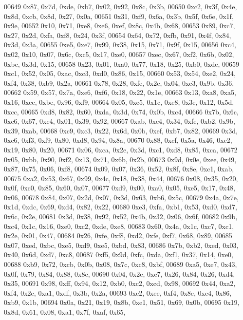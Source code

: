 \begin{DoxyCode}
00649   0x87, 0x7d, 0xde, 0xb7, 0x02, 0x92, 0x8c, 0x3b,
00650   0xc2, 0x3f, 0x4e, 0x8d, 0xcb, 0x8d, 0x27, 0x0a,
00651   0x31, 0xf9, 0x6a, 0x3b, 0x5f, 0x6e, 0x1f, 0x9e,
00652   0x10, 0x71, 0xe8, 0xe6, 0xef, 0x8c, 0x4b, 0x68,
00653   0x89, 0xc7, 0x27, 0x2d, 0xfa, 0xf8, 0x24, 0x3f,
00654   0x64, 0x72, 0xfb, 0x91, 0x4f, 0x84, 0x3d, 0x3a,
00655   0xe5, 0xe7, 0x99, 0x38, 0x15, 0x71, 0x9f, 0x15,
00656   0xc4, 0x02, 0x10, 0x07, 0x6c, 0xc5, 0x17, 0xe0,
00657   0xec, 0x67, 0xf2, 0x6b, 0x02, 0xbc, 0x3d, 0x15,
00658   0x23, 0x01, 0xa0, 0x77, 0x18, 0x25, 0xb0, 0xde,
00659   0xc1, 0x52, 0x05, 0xac, 0xc3, 0xd0, 0x86, 0x15,
00660   0x53, 0x54, 0xe2, 0x24, 0xf4, 0x38, 0xb9, 0x2a,
00661   0x78, 0x28, 0xfe, 0x2c, 0x04, 0xc3, 0x9b, 0x36,
00662   0x59, 0x57, 0x7a, 0xe6, 0xf6, 0x18, 0x22, 0x1e,
00663   0x13, 0xa8, 0xa5, 0x16, 0xee, 0xbe, 0x96, 0xf9,
00664   0x05, 0xe5, 0x1c, 0xe8, 0x3e, 0x12, 0x5d, 0xcc,
00665   0xd8, 0x82, 0x60, 0xda, 0x3d, 0x74, 0x0b, 0xc4,
00666   0x7b, 0x6c, 0xc6, 0x67, 0xe4, 0x01, 0x39, 0x92,
00667   0xab, 0xe4, 0x34, 0xfe, 0xb2, 0x9b, 0x39, 0xab,
00668   0xc9, 0xc3, 0x22, 0x6d, 0x0b, 0xef, 0xb7, 0x82,
00669   0x3d, 0xc6, 0xf3, 0xf9, 0x80, 0xd8, 0x94, 0x8a,
00670   0x88, 0xcf, 0x5a, 0x46, 0xc2, 0x19, 0x80, 0x20,
00671   0x06, 0xca, 0x2e, 0x3d, 0xc1, 0xd8, 0x85, 0xca,
00672   0x05, 0xbb, 0x90, 0xf2, 0x13, 0x71, 0x6b, 0x2b,
00673   0x9d, 0x0e, 0xee, 0x49, 0x87, 0x75, 0x06, 0xf8,
00674   0x09, 0x07, 0x36, 0x52, 0x8f, 0x8e, 0xc1, 0xab,
00675   0xa2, 0x53, 0x67, 0x99, 0x4c, 0x18, 0x38, 0x44,
00676   0x08, 0x35, 0x20, 0x0f, 0xc0, 0x85, 0x60, 0x07,
00677   0xd9, 0x00, 0xa0, 0x05, 0xe5, 0x17, 0x48, 0x06,
00678   0x84, 0x07, 0x2d, 0x07, 0x3d, 0x63, 0xb6, 0x5c,
00679   0x4a, 0x7e, 0x1d, 0xdc, 0x69, 0xd4, 0x82, 0x22,
00680   0xe3, 0xfa, 0xb1, 0x53, 0xd0, 0xd7, 0x6c, 0x2e,
00681   0x3d, 0x38, 0x92, 0x52, 0x4b, 0x32, 0x06, 0x6f,
00682   0x9b, 0xc4, 0x1c, 0x16, 0xe0, 0xc2, 0xde, 0xe8,
00683   0x60, 0x4a, 0x1c, 0xc7, 0xc1, 0x2e, 0x01, 0x47,
00684   0x26, 0xfe, 0xf8, 0xd2, 0xfe, 0xf7, 0x68, 0x89,
00685   0x07, 0xed, 0xbc, 0xe5, 0xd9, 0xe5, 0xbd, 0x83,
00686   0x7b, 0xb2, 0xed, 0x03, 0x40, 0x6d, 0xd7, 0xc8,
00687   0xf5, 0x9d, 0xfc, 0xda, 0xf1, 0x37, 0x14, 0xe0,
00688   0xb9, 0x72, 0xcb, 0x0b, 0x08, 0x7c, 0xc8, 0xbf,
00689   0xa5, 0xe7, 0x43, 0x0f, 0x79, 0x84, 0x88, 0x8c,
00690   0x04, 0x2e, 0xe7, 0x26, 0x84, 0x26, 0xd4, 0x35,
00691   0x98, 0xff, 0x94, 0x12, 0xb0, 0xc2, 0xcd, 0x98,
00692   0x44, 0xa2, 0xf4, 0x2e, 0xa1, 0xdf, 0x3b, 0x2a,
00693   0xc2, 0xee, 0xf4, 0x8e, 0xc4, 0x86, 0xb9, 0x1b,
00694   0x0a, 0x21, 0x19, 0x8b, 0xe1, 0x51, 0x69, 0x0b,
00695   0x19, 0x8d, 0x61, 0x08, 0xa1, 0x7f, 0xaf, 0x65,

\end{DoxyCode}

